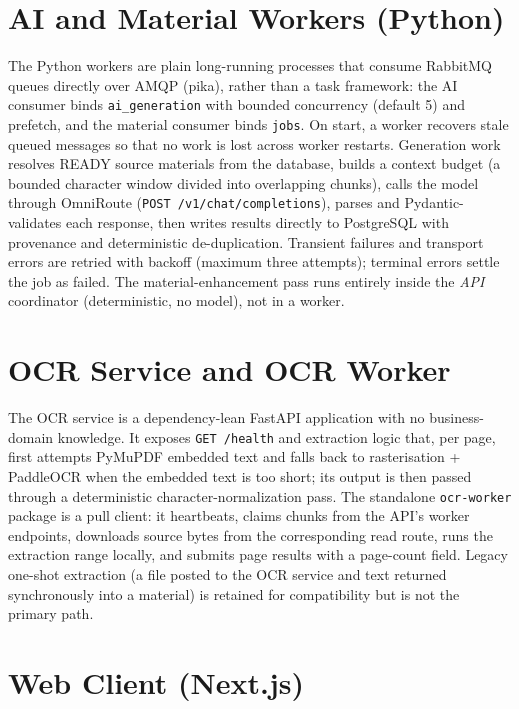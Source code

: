 \section{AI and Material Workers (Python)}

\noindent The Python workers are plain long-running processes that consume
RabbitMQ queues directly over AMQP (pika), rather than a task framework: the
AI consumer binds \texttt{ai\_generation} with bounded concurrency (default 5)
and prefetch, and the material consumer binds \texttt{jobs}. On start, a
worker recovers stale queued messages so that no work is lost across worker
restarts. Generation work resolves READY source materials from the database,
builds a context budget (a bounded character window divided into overlapping
chunks), calls the model through OmniRoute (\texttt{POST
/v1/chat/completions}), parses and Pydantic-validates each response, then
writes results directly to PostgreSQL with provenance and deterministic
de-duplication. Transient failures and transport errors are retried with
backoff (maximum three attempts); terminal errors settle the job as failed.
The material-enhancement pass runs entirely inside the \emph{API} coordinator
(deterministic, no model), not in a worker.

\section{OCR Service and OCR Worker}

\noindent The OCR service is a dependency-lean FastAPI application with no
business-domain knowledge. It exposes \texttt{GET /health} and extraction
logic that, per page, first attempts PyMuPDF embedded text and falls back to
rasterisation + PaddleOCR when the embedded text is too short; its output is
then passed through a deterministic character-normalization pass. The
standalone \texttt{ocr-worker} package is a pull client: it heartbeats, claims
chunks from the API's worker endpoints, downloads source bytes from the
corresponding read route, runs the extraction range locally, and submits page
results with a page-count field. Legacy one-shot extraction (a file posted to
the OCR service and text returned synchronously into a material) is retained
for compatibility but is not the primary path.

\section{Web Client (Next.js)}

